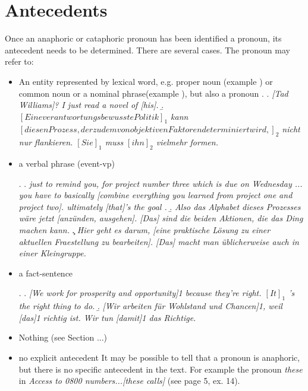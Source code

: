 \documentclass[a4paper]{article}
\begin{document}
{{\section{Antecedents}

Once an anaphoric or cataphoric pronoun has been identified a pronoun, its antecedent needs to be determined. There are several cases. The pronoun may refer to:

\begin{itemize}
\item An entity represented by lexical word, e.g. proper noun (example \Next[a]) or common noun or a nominal phrase(example \Next[b]), but also a pronoun  
\ex. 
\a. {\sl [Tad Williams]? I just read a novel of [his].}
\b. {\sl \([Eine verantwortungsbewusste Politik]_1\) kann\\ \([diesen Prozess, der zudem von objektiven Faktoren determiniert wird,]_2\) nicht nur flankieren. \([Sie]_1\) muss \([ihn]_2\) vielmehr formen.}

\item a verbal phrase (event-vp)

\ex.
\a. {\sl just to remind you, for project number three which is due on Wednesday ... you have to basically [combine everything you learned from project one and project two]. ultimately [that]'s the goal .}
\b. {\sl Also das Alphabet dieses Prozesses wäre jetzt [anzünden, ausgehen]. [Das] sind die beiden Aktionen, die das Ding machen kann.}
\c. {\sl Hier geht es darum, [eine praktische Lösung zu einer aktuellen Fraestellung zu bearbeiten]. [Das] macht man üblicherweise auch in einer Kleingruppe.}

\item a fact-sentence

\ex.
\a.  {\sl  [We work for prosperity and opportunity]1 because they’re right. \([It]_1\) 's the right thing to do.}
\b. {\sl [Wir arbeiten für Wohlstand und Chancen]1, weil [das]1 richtig ist. Wir tun [damit]1 das Richtige.}

\item Nothing (see Section ...)
\item  no explicit antecedent It may be possible to tell that a pronoun is anaphoric, but there is no specific antecedent in the text. For example the pronoun {\sl these} in {\sl Access
to 0800 numbers...[these calls]} (see page 5, ex. 14).


\end{itemize}}}
\end{document}
